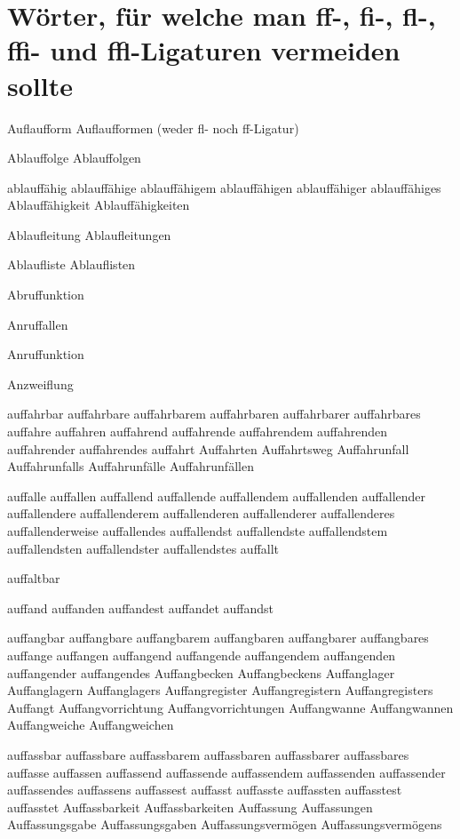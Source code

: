 


\section*{Wörter, für welche man ff-, fi-, fl-, ffi- und ffl-Ligaturen vermeiden sollte}

Auflaufform Auflaufformen (weder fl- noch ff-Ligatur)

\smallskip
Ablauffolge Ablauffolgen

ablauffähig ablauffähige ablauffähigem ablauffähigen ablauffähiger ablauffähiges Ablauffähigkeit Ablauffähigkeiten

Ablaufleitung Ablaufleitungen

Ablaufliste Ablauflisten

Abruffunktion

Anruffallen

Anruffunktion

Anzweiflung

auffahrbar auffahrbare auffahrbarem auffahrbaren auffahrbarer auffahrbares auffahre auffahren auffahrend auffahrende auffahrendem auffahrenden auffahrender auffahrendes auffahrt Auffahrten Auffahrtsweg Auffahrunfall Auffahrunfalls Auffahrunfälle Auffahrunfällen

auffalle auffallen auffallend auffallende auffallendem auffallenden auffallender auffallendere auffallenderem auffallenderen auffallenderer auffallenderes auffallenderweise auffallendes auffallendst auffallendste auffallendstem auffallendsten auffallendster auffallendstes auffallt

auffaltbar

auffand auffanden auffandest auffandet auffandst

auffangbar auffangbare auffangbarem auffangbaren auffangbarer auffangbares auffange auffangen auffangend auffangende auffangendem auffangenden auffangender auffangendes Auffangbecken Auffangbeckens Auffanglager Auffanglagern Auffanglagers Auffangregister Auffangregistern Auffangregisters Auffangt Auffangvorrichtung Auffangvorrichtungen Auffangwanne Auffangwannen Auffangweiche Auffangweichen

auffassbar auffassbare auffassbarem auffassbaren auffassbarer auffassbares auffasse auffassen auffassend auffassende auffassendem auffassenden auffassender auffassendes auffassens auffassest auffasst auffasste auffassten auffasstest auffasstet Auffassbarkeit Auffassbarkeiten Auffassung Auffassungen Auffassungsgabe Auffassungsgaben Auffassungsvermögen Auffassungsvermögens

